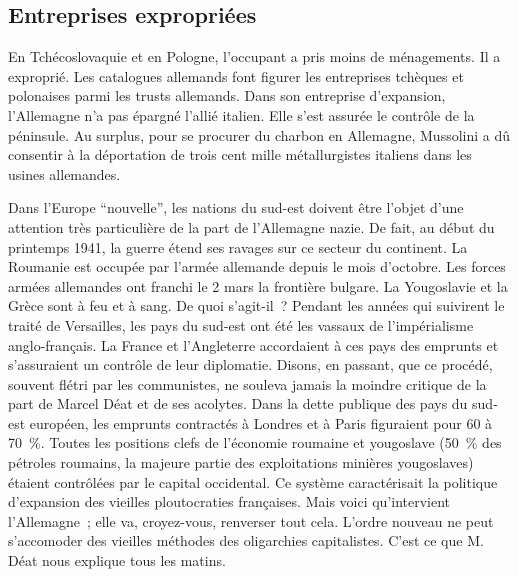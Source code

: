 \documentclass[french,twoside]{book} %
\begin{document}
\subsection[Entreprises expropriées]{Entreprises expropriées}
\noindent En Tchécoslovaquie et en Pologne, l’occupant a pris moins de ménagements. Il a exproprié. Les catalogues allemands font figurer les entreprises tchèques et polonaises parmi les trusts allemands. Dans son entreprise d’expansion, l’Allemagne n’a pas épargné l’allié italien. Elle s’est assurée le contrôle de la péninsule. Au surplus, pour se procurer du charbon en Allemagne, Mussolini a dû consentir à la déportation de trois cent mille métallurgistes italiens dans les usines allemandes.\par
Dans l’Europe “nouvelle”, les nations du sud-est doivent être l’objet d’une attention très particulière de la part de l’Allemagne nazie. De fait, au début du printemps 1941, la guerre étend ses ravages sur ce secteur du continent. La Roumanie est occupée par l’armée allemande depuis le mois d’octobre. Les forces armées allemandes ont franchi le 2 mars la frontière bulgare. La Yougoslavie et la Grèce sont à feu et à sang. De quoi s’agit-il ? Pendant les années qui suivirent le traité de Versailles, les pays du sud-est ont été les vassaux de l’impérialisme anglo-français. La France et l’Angleterre accordaient à ces pays des emprunts et s’assuraient un contrôle de leur diplomatie. Disons, en passant, que ce procédé, souvent flétri par les communistes, ne souleva jamais la moindre critique de la part de Marcel Déat et de ses acolytes. Dans la dette publique des pays du sud-est européen, les emprunts contractés à Londres et à Paris figuraient pour 60 à 70 \%. Toutes les positions clefs de l’économie roumaine et yougoslave (50 \% des pétroles roumains, la majeure partie des exploitations minières yougoslaves) étaient contrôlées par le capital occidental. Ce système caractérisait la politique d’expansion des vieilles ploutocraties françaises. Mais voici qu’intervient l’Allemagne ; elle va, croyez-vous, renverser tout cela. L’ordre nouveau ne peut s’accomoder des vieilles méthodes des oligarchies capitalistes. C’est ce que M. Déat nous explique tous les matins.\par
\end{document}
